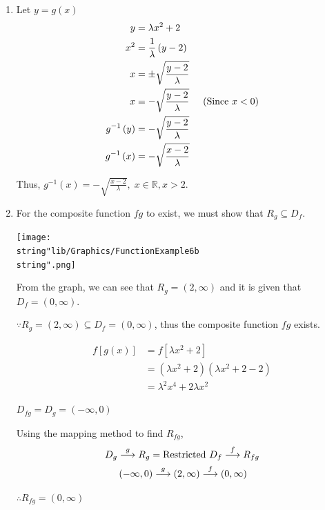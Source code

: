 \documentclass[11pt,a4paper]{book}
\newcommand{\R}{\mathbb{R}}
\begin{document}
\begin{example}{}
\begin{enumerate}[label=(\alph*)]
\begin{enumerate}[label=(\roman*)]

\item Let $y=g\left(x\right)$
\begin{align*}
y & =\lambda x^{2}+2\\
x^{2} & =\frac{1}{\lambda}\left(y-2\right)\\
x & =\pm\sqrt{\frac{y-2}{\lambda}}\\
x & =-\sqrt{\frac{y-2}{\lambda}}\hspace{0.5cm}\text{(Since $x<0$)}\\
g^{-1}\left(y\right) & =-\sqrt{\frac{y-2}{\lambda}}\\
g^{-1}\left(x\right) & =-\sqrt{\frac{x-2}{\lambda}}
\end{align*}


Thus, ${\displaystyle g^{-1}\left(x\right)=-\sqrt{\frac{x-2}{\lambda}},\;x\in\R,x>2}$.

\newpage

\item  For the composite function $fg$ to exist, we must show that
$R_{g}\subseteq D_{f}$.
\begin{center}
\texttt{[image: \\string"lib/Graphics/FunctionExample6b\\string".png]}
\par\end{center}

From the graph, we can see that $R_{g}=\left(2,\infty\right)$ and
it is given that $D_{f}=\left(0,\infty\right)$.

$\because R_{g}=\left(2,\infty\right)\subseteq D_{f}=\left(0,\infty\right)$,
thus the composite function $fg$ exists.

\begin{align*}
f\left[g\left(x\right)\right] & =f\left[\lambda x^{2}+2\right]\\
 & =\left(\lambda x^{2}+2\right)\left(\lambda x^{2}+2-2\right)\\
 & =\lambda^{2}x^{4}+2\lambda x^{2}
\end{align*}

$D_{fg}=D_{g}=\left(-\infty,0\right)$

Using the mapping method to find $R_{fg}$,
\begin{align*}
D_{g} & \overset{g}{\longrightarrow}R_{g}=\text{Restricted \ensuremath{D_{f}}}\overset{f}{\longrightarrow}R_{fg}\\
 & \left(-\infty,0\right)\overset{g}{\longrightarrow}\left(2,\infty\right)\overset{f}{\longrightarrow}\left(0,\infty\right)
\end{align*}

$\therefore R_{fg}=\left(0,\infty\right)$

\end{enumerate}
\end{enumerate}
\end{example}
\end{document}
